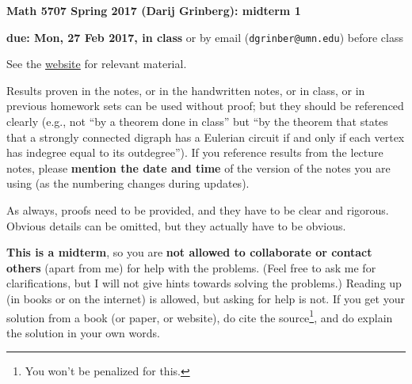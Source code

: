 \documentclass[numbers=enddot,12pt,final,onecolumn,notitlepage]{scrartcl}%
\theoremstyle{definition}
\begin{document}
\begin{center}
\textbf{Math 5707 Spring 2017 (Darij Grinberg): midterm 1}

\textbf{due: Mon, 27 Feb 2017, in class} or by email
(\texttt{dgrinber@umn.edu}) before class
\end{center}

See the \href{http://www.cip.ifi.lmu.de/~grinberg/t/17s}{website} for relevant material.

Results proven in the notes, or in the handwritten notes, or in class, or in previous homework sets can be used without proof; but they should be referenced clearly (e.g., not ``by a theorem done in class'' but ``by the theorem that states that a strongly connected digraph has a Eulerian circuit if and only if each vertex has indegree equal to its outdegree'').
If you reference results from the lecture notes, please \textbf{mention the date and time} of the version of the notes you are using (as the numbering changes during updates).

As always, proofs need to be provided, and they have to be clear and rigorous. Obvious details can be omitted, but they actually have to be obvious.



\textbf{This is a midterm}, so you are \textbf{not allowed to collaborate or contact others} (apart from me) for help with the problems. (Feel free to ask me for clarifications, but I will not give hints towards solving the problems.) Reading up (in books or on the internet) is allowed, but asking for help is not. If you get your solution from a book (or paper, or website), do cite the source\footnote{You won't be penalized for this.}, and do explain the solution in your own words.
\end{document}
